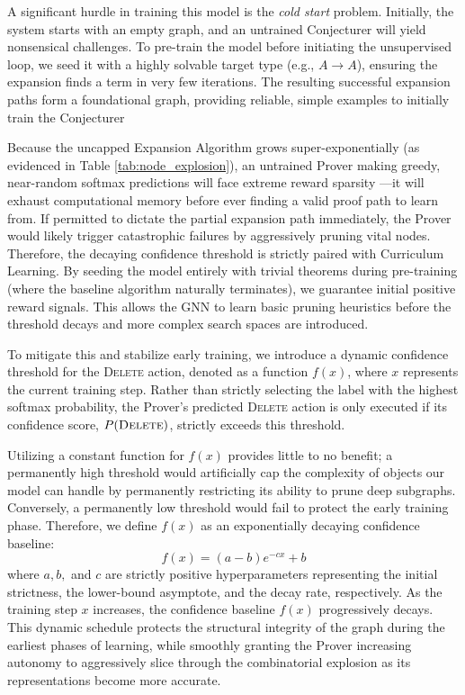 A significant hurdle in training this model is the \textit{cold start} problem. Initially, the system starts 
with an empty graph, and an untrained Conjecturer will yield nonsensical challenges. 
To pre-train the model before initiating the unsupervised loop, we seed it with a highly solvable 
target type (e.g., $A \to A$), ensuring the expansion finds a term in very few iterations. The resulting 
successful expansion paths form a foundational graph, providing reliable, simple examples to initially 
train the Conjecturer

Because the uncapped Expansion Algorithm grows super-exponentially (as evidenced in Table \ref{tab:node_explosion}), 
an untrained Prover making greedy, near-random softmax predictions will face extreme reward sparsity ---it will exhaust 
computational memory before ever finding a valid proof path to learn from. If permitted to dictate the partial expansion 
path immediately, the Prover would likely trigger catastrophic failures by aggressively pruning vital nodes. 
Therefore, the decaying confidence threshold is strictly paired with Curriculum Learning. 
By seeding the model entirely with trivial theorems during pre-training 
(where the baseline algorithm naturally terminates), we guarantee initial positive reward signals. 
This allows the GNN to learn basic pruning heuristics before the threshold decays and more complex search spaces are introduced.

To mitigate this and stabilize early training, we introduce a dynamic confidence threshold for the 
\textsc{Delete} action, denoted as a function $f(x)$, where $x$ represents the current training step. 
Rather than strictly selecting the label with the highest softmax probability, the Prover's predicted 
\textsc{Delete} action is only executed if its confidence score, $P(\textsc{Delete})$, strictly exceeds 
this threshold. 

Utilizing a constant function for $f(x)$ provides little to no benefit; a permanently high threshold 
would artificially cap the complexity of objects our model can handle by permanently restricting 
its ability to prune deep subgraphs. Conversely, a permanently low threshold would fail to protect 
the early training phase. Therefore, we define $f(x)$ as an exponentially decaying confidence baseline:
$$f(x) = (a - b)e^{-cx} + b$$
where $a, b,$ and $c$ are strictly positive hyperparameters representing the initial strictness, 
the lower-bound asymptote, and the decay rate, respectively. As the training step $x$ increases, 
the confidence baseline $f(x)$ progressively decays. This dynamic schedule protects the structural 
integrity of the graph during the earliest phases of learning, while smoothly granting the Prover 
increasing autonomy to aggressively slice through the combinatorial explosion as its representations 
become more accurate.
